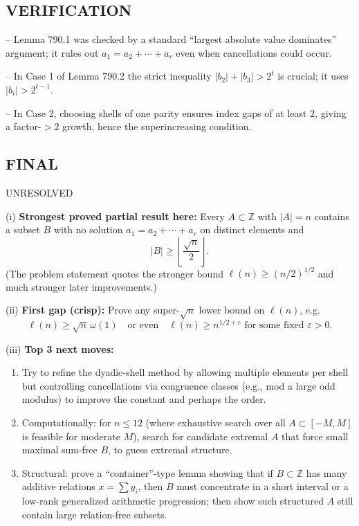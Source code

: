 \subsection*{VERIFICATION}
-- Lemma 790.1 was checked by a standard ``largest absolute value dominates'' argument; it rules out 
$a_1=a_2+\cdots+a_r$ even when cancellations could occur.

-- In Case 1 of Lemma 790.2 the strict inequality $|b_2|+|b_3|>2^t$ is crucial; it uses $|b_i|>2^{t-1}$.

-- In Case 2, choosing shells of one parity ensures index gaps of at least $2$, giving a factor-$>2$ growth, hence the superincreasing condition.

\subsection*{FINAL}
UNRESOLVED

(i) \textbf{Strongest proved partial result here:} Every $A\subset\mathbb Z$ with $|A|=n$ contains a subset $B$ with no solution $a_1=a_2+\cdots+a_r$ on distinct elements and
\[|B|\ge \left\lfloor \frac{\sqrt n}{2}\right\rfloor.
\]
(The problem statement quotes the stronger bound $\ell(n)\ge (n/2)^{1/2}$ and much stronger later improvements.)

(ii) \textbf{First gap (crisp):} Prove any super-$\sqrt n$ lower bound on $\ell(n)$, e.g.
\[\ell(n)\ge \sqrt n\,\omega(1)\quad\text{or even}\quad \ell(n)\ge n^{1/2+\varepsilon}\text{ for some fixed }\varepsilon>0.
\]

(iii) \textbf{Top 3 next moves:}
\begin{enumerate}
\item Try to refine the dyadic-shell method by allowing multiple elements per shell but controlling cancellations via congruence classes (e.g., mod a large odd modulus) to improve the constant and perhaps the order.
\item Computationally: for $n\le 12$ (where exhaustive search over all $A\subset[-M,M]$ is feasible for moderate $M$), search for candidate extremal $A$ that force small maximal sum-free $B$, to guess extremal structure.
\item Structural: prove a ``container''-type lemma showing that if $B\subset\mathbb Z$ has many additive relations $x=\sum y_i$, then $B$ must concentrate in a short interval or a low-rank generalized arithmetic progression; then show such structured $A$ still contain large relation-free subsets.
\end{enumerate}


